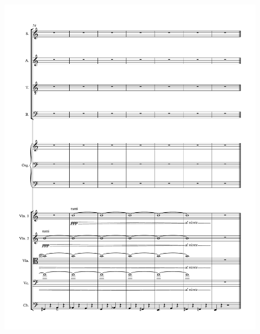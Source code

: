 \begin{figure}[htbp]
    \centering
	\includegraphics[width=6.5in]{figures/Stabat_Mater_14.pdf}
\end{figure}




